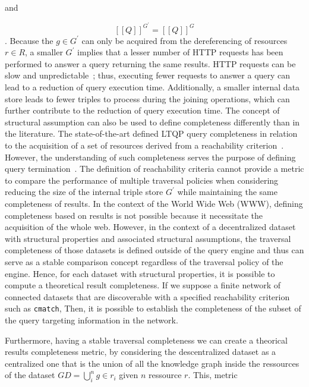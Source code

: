 and 

\begin{equation}\label{eq:evalQueryStructuralAssumption}
   [\![ Q ]\!]^{G^{\prime}} = [\![ Q ]\!]^{G}
\end{equation}
.
Because the $g \in G^{\prime}$ can only be acquired from the dereferencing of resources $r \in R$, a smaller $G^\prime$ implies that a lesser number of HTTP requests has been performed to answer a query
returning the same results.
HTTP requests can be slow and unpredictable~\cite{hartig2016walking}; thus, executing fewer requests to answer a query can lead to a reduction of query execution time.
Additionally, a smaller internal data store leads to fewer triples to process during the joining operations, which can further contribute to the reduction of query execution time.
The concept of structural assumption can also be used to define completeness differently than in the literature.
The state-of-the-art defined LTQP query completeness in relation to the acquisition of a set of resources derived from a reachability criterion~\cite{Hartig2012}.
However, the understanding of such completeness serves the purpose of defining query termination~\cite{Hartig2012}.
The definition of reachability criteria cannot provide a metric to compare the performance of multiple traversal policies
when considering reducing the size of the internal triple store $G^{\prime}$ while maintaining the same completeness of results.
In the context of the World Wide Web (WWW), defining completeness based on results is not possible because it necessitate the acquisition of the whole web.
However, in the context of a decentralized dataset with structural properties and associated structural assumptions,
the traversal completeness of those datasets is defined outside of the query engine and thus can serve as a 
stable comparison concept regardless of the traversal policy of the engine.
Hence, for each dataset with structural properties, it is possible to compute a theoretical result completeness.
If we suppose a finite network of connected datasets that are discoverable with a specified reachability criterion such as \texttt{cmatch},
Then, it is possible to establish the completeness of the subset of the query targeting information in the network.



Furthermore, having a stable traversal completeness we can create a theorical results completeness metric, by considering the descentralized dataset as a centralized one that is the union 
of all the knowledge graph inside the ressources of the dataset $GD = \bigcup\limits_{i}^{n} g\in r_i$ given $n$ ressource $r$.
This, metric 

